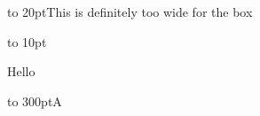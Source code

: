 \documentclass{article}
\begin{document}
\noindent\hbox to 20pt{This is definitely too wide for the box}

\vbox to 10pt{Hello\par\vfill}
\noindent\hbox to 300pt{\hfil A\hfil}
\end{document}
